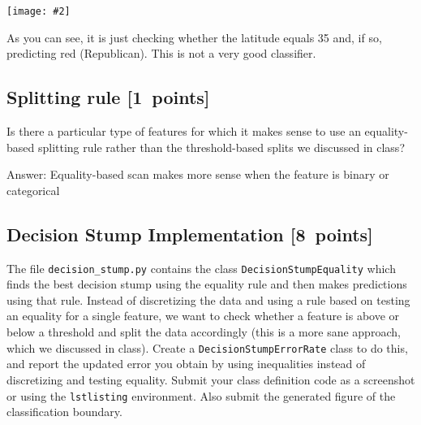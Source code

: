 \documentclass{article}
\newcommand{\blu}[1]{{\textcolor{blu}{#1}}}
\newcommand{\gre}[1]{\textcolor{gre}{#1}}
\newcommand\ans[1]{\par\gre{Answer: #1}}
\let\ask\blu
\newcommand\pts[1]{\textcolor{pointscolour}{[#1~points]}}
\newcommand{\centerfig}[2]{\begin{center}\texttt{[image: \#2]}\end{center}}
\begin{document}
  \centerfig{0.7}{./figs/q6_decisionBoundary}

  As you can see, it is just checking whether the latitude equals 35 and, if so, predicting red (Republican).
  This is not a very good classifier.

  \subsection{Splitting rule \pts{1}}

  Is there a particular type of features for which it makes sense to use an equality-based splitting rule rather than the threshold-based splits we discussed in class?

  \ans{Equality-based scan makes more sense when the feature is binary or categorical }

  \subsection{Decision Stump Implementation \pts{8}}

  The file \texttt{decision\string_stump.py} contains the class \texttt{DecisionStumpEquality} which
  finds the best decision stump using the equality rule and then makes predictions using that
  rule. Instead of discretizing the data and using a rule based on testing an equality for
  a single feature, we want to check whether a feature is above or below a threshold and
  split the data accordingly (this is a more sane approach, which we discussed in class).
  \ask{Create a \texttt{DecisionStumpErrorRate} class to do this, and report the updated error you
  obtain by using inequalities instead of discretizing and testing equality.
  Submit your class definition code as a screenshot or using the \texttt{lstlisting} environment.
  Also submit the generated figure of the classification boundary.}
\end{document}
